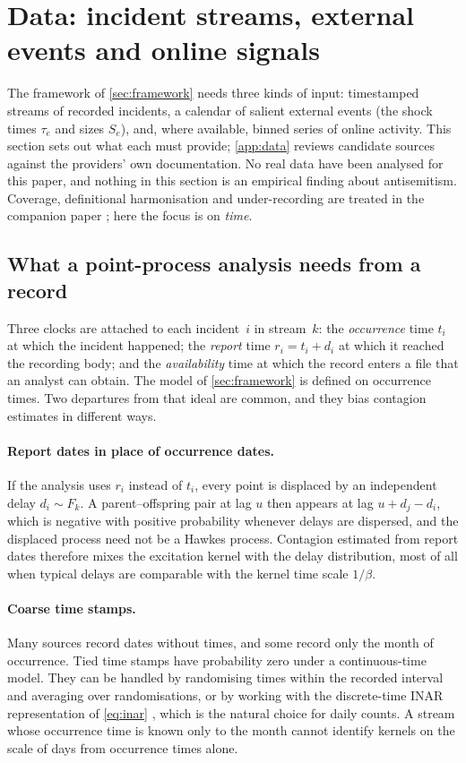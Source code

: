 \section{Data: incident streams, external events and online signals}\label{sec:data}

The framework of \cref{sec:framework} needs three kinds of input:
timestamped streams of recorded incidents, a calendar of salient external
events (the shock times $\tau_e$ and sizes $S_e$), and, where available,
binned series of online activity. This section sets out what each must
provide; \cref{app:data} reviews candidate sources against the providers' own
documentation. No real data have been analysed for this paper, and nothing
in this section is an empirical finding about antisemitism. Coverage,
definitional harmonisation and under-recording are treated in the companion
paper \citep{kornsteinlab2026darkfigure}; here the focus is on \emph{time}.

\subsection{What a point-process analysis needs from a record}\label{sec:data-needs}

Three clocks are attached to each incident~$i$ in stream~$k$: the
\emph{occurrence} time $t_i$ at which the incident happened; the
\emph{report} time $r_i = t_i + d_i$ at which it reached the recording body;
and the \emph{availability} time at which the record enters a file that an
analyst can obtain. The model of \cref{sec:framework} is defined on
occurrence times. Two departures from that ideal are common, and they bias
contagion estimates in different ways.

\paragraph{Report dates in place of occurrence dates.}
If the analysis uses $r_i$ instead of $t_i$, every point is displaced by an independent
delay $d_i\sim F_k$. A parent--offspring pair at lag $u$ then appears at lag
$u+d_j-d_i$, which is negative with positive probability whenever delays are dispersed,
and the displaced process need not be a Hawkes process. Contagion estimated from report
dates therefore mixes the excitation kernel with the delay distribution, most of all when
typical delays are comparable with the kernel time scale $1/\beta$.

\paragraph{Coarse time stamps.}
Many sources record dates without times, and some record only the month of
occurrence. Tied time stamps have probability zero under a
continuous-time model. They can be handled by randomising times within the recorded
interval and averaging over randomisations, or by working with the
discrete-time INAR representation of \cref{eq:inar} \citep{kirchner2016},
which is the natural choice for daily counts. A stream whose occurrence time
is known only to the month cannot identify kernels on the scale of days
from occurrence times alone.


